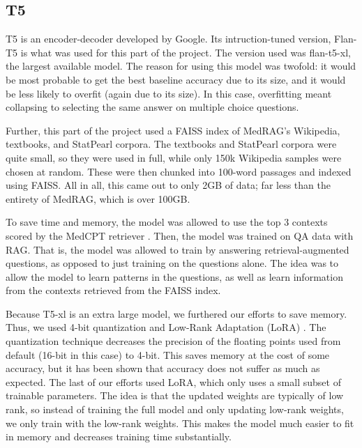 \documentclass{article}
\begin{document}
\subsection{T5}

T5 is an encoder-decoder developed by Google. Its intruction-tuned version, Flan-T5 \cite{chung2022scalinginstructionfinetunedlanguagemodels} is what was used for this part of the project. The version used was flan-t5-xl, the largest available model. The reason for using this model was twofold: it would be most probable to get the best baseline accuracy due to its size, and it would be less likely to overfit (again due to its size). In this case, overfitting meant collapsing to selecting the same answer on multiple choice questions.

Further, this part of the project used a FAISS \cite{douze2025faisslibrary} index of MedRAG's Wikipedia, textbooks, and StatPearl corpora. The textbooks and StatPearl corpora were quite small, so they were used in full, while only 150k Wikipedia samples were chosen at random. These were then chunked into 100-word passages and indexed using FAISS. All in all, this came out to only 2GB of data; far less than the entirety of MedRAG, which is over 100GB.

To save time and memory, the model was allowed to use the top 3 contexts scored by the MedCPT retriever \cite{Jin_2023}. Then, the model was trained on QA data with RAG. That is, the model was allowed to train by answering retrieval-augmented questions, as opposed to just training on the questions alone. The idea was to allow the model to learn patterns in the questions, as well as learn information from the contexts retrieved from the FAISS index.

Because T5-xl is an extra large model, we furthered our efforts to save memory. Thus, we used 4-bit quantization \cite{dettmers2023qloraefficientfinetuningquantized} and Low-Rank Adaptation (LoRA) \cite{hu2021loralowrankadaptationlarge}. The quantization technique decreases the precision of the floating points used from default (16-bit in this case) to 4-bit. This saves memory at the cost of some accuracy, but it has been shown that accuracy does not suffer as much as expected. The last of our efforts used LoRA, which only uses a small subset of trainable parameters. The idea is that the updated weights are typically of low rank, so instead of training the full model and only updating low-rank weights, we only train with the low-rank weights. This makes the model much easier to fit in memory and decreases training time substantially.
\end{document}
